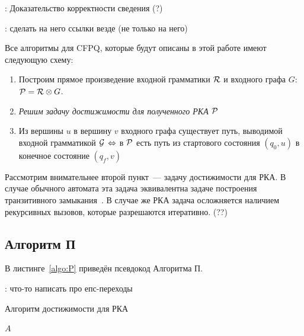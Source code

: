     \TODO: Доказательство корректности сведения (?)


    \TODO: сделать на него ссылки везде (не только на него)

    Все алгоритмы для CFPQ, которые будут описаны в этой работе имеют следующую схему:
    \begin{enumerate}
        \item Построим прямое произведение входной грамматики $\mathcal{R}$ и входного графа $G$: $\mathcal{P} = \mathcal{R} \otimes G$.
        \item \textit{Решим задачу достижимости для полученного РКА $\mathcal{P}$}
        \item Из вершины $u$ в вершину $v$ входного графа существует путь, выводимой входной грамматикой $\mathcal{G}$ $\Leftrightarrow$ в $\mathcal{P}$ есть путь из стартового состояния $(q_0, u)$ в конечное состояние $(q_f, v)$
    \end{enumerate}

    Рассмотрим внимательнее второй пункт~--- задачу достижимости для РКА. В случае обычного автомата эта задача эквивалентна задаче построения транзитивного замыкания~\cite{Yannakakis1990}. В случае же РКА задача осложняется наличием рекурсивных вызовов, которые разрешаются итеративно. (??)

\subsection{Алгоритм П}

    В листинге~\ref{algo:P} приведён псевдокод Алгоритма П.

    \TODO: что-то написать про епс-переходы

    \begin{algorithm}[H]
        \begin{algorithmic}[1]
        \caption{Алгоритм достижимости для РКА}
        \label{algo:P}
                            \EndIf
                        \EndFor
                   \EndFor
                \EndFor
            \EndWhile
        \State \Return $A$
        \EndFunction
        \end{algorithmic}
    \end{algorithm}

